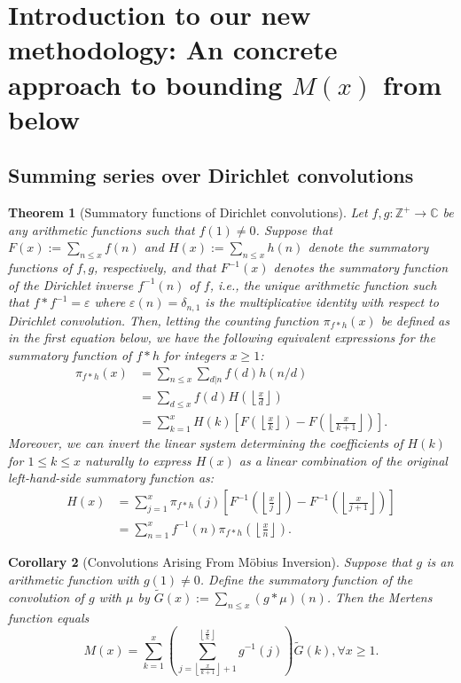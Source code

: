 \documentclass[11pt,reqno,a4letter]{article}
\numberwithin{figure}{section}
\numberwithin{table}{section}
\newcommand{\floor}[1]{\left\lfloor #1 \right\rfloor}
\newcommand{\Floor}[2]{\ensuremath{\left\lfloor \frac{#1}{#2} \right\rfloor}}
\theoremstyle{plain}
\newtheorem{theorem}{Theorem}
\newtheorem{cor}[theorem]{Corollary}
\numberwithin{theorem}{section}
\theoremstyle{definition}
\begin{document}
\newpage 
\section{Introduction to our new methodology: An concrete approach to bounding $M(x)$ from below} 

\subsection{Summing series over Dirichlet convolutions} 

\begin{theorem}[Summatory functions of Dirichlet convolutions] 
\label{theorem_SummatoryFuncsOfDirCvls} 
Let $f,g: \mathbb{Z}^{+} \rightarrow \mathbb{C}$ be any arithmetic functions such that $f(1) \neq 0$. 
Suppose that $F(x) := \sum_{n \leq x} f(n)$ and $H(x) := \sum_{n \leq x} h(n)$ denote the summatory 
functions of $f,g$, respectively, and that $F^{-1}(x)$ denotes the summatory function of the 
Dirichlet inverse $f^{-1}(n)$ of $f$, i.e., the unique arithmetic function such that 
$f \ast f^{-1} = \varepsilon$ where $\varepsilon(n) = \delta_{n,1}$ is the multiplicative identity 
with respect to Dirichlet convolution. Then, letting the counting function $\pi_{f \ast h}(x)$ be defined 
as in the first equation below, we have the following equivalent expressions for the 
summatory function of $f \ast h$ for integers $x \geq 1$: 
\begin{align*} 
\pi_{f \ast h}(x) & = \sum_{n \leq x} \sum_{d|n} f(d) h(n/d) \\ 
     & = \sum_{d \leq x} f(d) H\left(\Floor{x}{d}\right) \\ 
     & = \sum_{k=1}^{x} H(k) \left[F\left(\Floor{x}{k}\right) - 
     F\left(\Floor{x}{k+1}\right)\right]. 
\end{align*} 
Moreover, we can invert the linear system determining the coefficients of $H(k)$ for $1 \leq k \leq x$ 
naturally to express $H(x)$ as a linear combination of the original left-hand-side summatory function as:
\begin{align*} 
H(x) & = \sum_{j=1}^{x} \pi_{f \ast h}(j) \left[F^{-1}\left(\Floor{x}{j}\right) - 
     F^{-1}\left(\Floor{x}{j+1}\right)\right] \\ 
     & = \sum_{n=1}^{x} f^{-1}(n) \pi_{f \ast h}\left(\Floor{x}{n}\right). 
\end{align*} 
\end{theorem} 

\begin{cor}[Convolutions Arising From M\"obius Inversion] 
\label{cor_CvlGAstMu} 
Suppose that $g$ is an arithmetic function with $g(1) \neq 0$. Define the summatory function of 
the convolution of $g$ with $\mu$ by $\widetilde{G}(x) := \sum_{n \leq x} (g \ast \mu)(n)$. 
Then the Mertens function equals 
\[
M(x) = \sum_{k=1}^{x} \left(\sum_{j=\floor{\frac{x}{k+1}}+1}^{\floor{\frac{x}{k}}} g^{-1}(j)\right) 
     \widetilde{G}(k), \forall x \geq 1. 
\]
\end{cor} 
\end{document}
